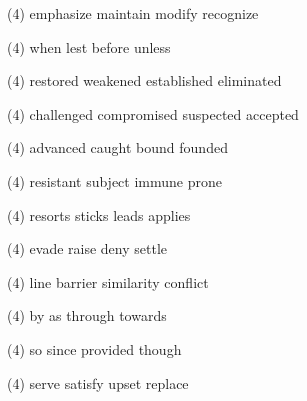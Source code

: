 \item
\begin{tasks}(4)
	\task emphasize
	\task maintain
	\task modify
	\task recognize
\end{tasks}
\item
\begin{tasks}(4)
	\task when
	\task lest
	\task before
	\task unless
\end{tasks}
\item
\begin{tasks}(4)
	\task restored
	\task weakened
	\task established
	\task eliminated
\end{tasks}
\item
\begin{tasks}(4)
	\task challenged
	\task compromised
	\task suspected
	\task accepted
\end{tasks}
\item
\begin{tasks}(4)
	\task advanced
	\task caught
	\task bound
	\task founded
\end{tasks}
\item
\begin{tasks}(4)
	\task resistant
	\task subject
	\task immune
	\task prone
\end{tasks}
\item
\begin{tasks}(4)
	\task resorts
	\task sticks
	\task leads
	\task applies
\end{tasks}
\item
\begin{tasks}(4)
	\task evade
	\task raise
	\task deny
	\task settle
\end{tasks}
\item
\begin{tasks}(4)
	\task line
	\task barrier
	\task similarity
	\task conflict
\end{tasks}
\item
\begin{tasks}(4)
	\task by
	\task as
	\task through
	\task towards
\end{tasks}
\item
\begin{tasks}(4)
	\task so
	\task since
	\task provided
	\task though
\end{tasks}
\item
\begin{tasks}(4)
	\task serve
	\task satisfy
	\task upset
	\task replace
\end{tasks}
\item
